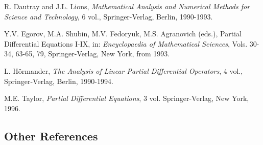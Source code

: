 \begin{list}{}{\setlength{\labelwidth}{3em}\setlength{\leftmargin}{4em}\setlength{\labelsep}{.8em}}
\item[{[DL]}] R. Dautray and J.L. Lions, \emph{Mathematical Analysis and Numerical Methods for Science and Technology}, 6 vol., Springer-Verlag, Berlin, 1990-1993.

\item[{[ESFA]}] Y.V. Egorov, M.A. Shubin, M.V. Fedoryuk, M.S. Agranovich (eds.), Partial Differential Equations I-IX, in: \emph{Encyclopaedia of Mathematical Sciences}, Vols. 30-34, 63-65, 79, Springer-Verlag, New York, from 1993.

\item[{[Hor]}] L. Hörmander, \emph{The Analysis of Linear Partial Differential Operators}, 4 vol., Springer-Verlag, Berlin, 1990-1994.

\item[{[Tay]}] M.E. Taylor, \emph{Partial Differential Equations}, 3 vol. Springer-Verlag, New York, 1996.
\end{list}

\subsection{Other References}\label{sec:references-other-references}

